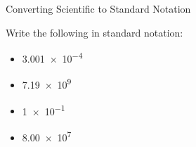 \documentclass[notes=only]{beamer}
\begin{document}
\begin{frame}{Converting Scientific to Standard Notation}
	\begin{example}
		Write the following in standard notation:
		\begin{itemize}
			\item \num{3.001e-4}
			\item \num{7.19e9}
			\item \num{1e-1}
			\item \num{8.00e7}
		\end{itemize}
	\end{example}
\end{frame}

%
%
%

%
\end{document}
